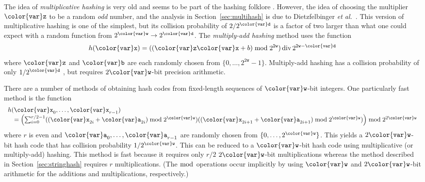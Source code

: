 \documentclass[10pt]{book}
\newcommand{\secref}[1]{Section~\ref{sec:#1}}
\theoremstyle{plain}
\theoremstyle{definition}
\newcommand{\etal}{\emph{et al.}}
\DeclareMathOperator{\ddiv}{div}
\begin{document}
The idea of \emph{multiplicative hashing}
%
%
is very old and seems to be
part of the hashing folklore \cite[Section~6.4]{k97v3}.  However, the
idea of choosing the multiplier \ensuremath{\mathtt{{\color{var}z}}} to be a random \emph{odd} number,
and the analysis in \secref{multihash} is due to Dietzfelbinger \etal\
\cite{dhkp97}.  This version of multiplicative hashing is one of the
simplest, but its collision probability of $2/2^{\ensuremath{\mathtt{{\color{var}d}}}}$ is a factor of two
larger than what one could expect with a random function from $2^{\ensuremath{\mathtt{{\color{var}w}}}}\to
2^{\ensuremath{\mathtt{{\color{var}d}}}}$.  The \emph{multiply-add hashing}
\index{hashing!multiply-add}%
%
method uses the function
\[
   h(\ensuremath{\mathtt{{\color{var}x}}}) = ((\ensuremath{\mathtt{{\color{var}z}}}\ensuremath{\mathtt{{\color{var}x}}} + b) \bmod 2^{\ensuremath{\mathtt{2w}}}) \ddiv 2^{\ensuremath{\mathtt{2w}}-\ensuremath{\mathtt{{\color{var}d}}}}
\]
where \ensuremath{\mathtt{{\color{var}z}}} and \ensuremath{\mathtt{{\color{var}b}}} are each randomly chosen from $\{0,\ldots,2^{\ensuremath{\mathtt{2w}}}-1\}$.
Multiply-add hashing has a collision probability of only $1/2^{\ensuremath{\mathtt{{\color{var}d}}}}$
\cite{d96}, but requires $2\ensuremath{\mathtt{{\color{var}w}}}$-bit precision arithmetic.

There are a number of methods of obtaining hash codes from fixed-length
sequences of \ensuremath{\mathtt{{\color{var}w}}}-bit integers.  One particularly fast method
\cite{bhkkr99} is the function
\[\begin{array}{l}
  h(\ensuremath{\mathtt{{\color{var}x}}}_0,\ldots,\ensuremath{\mathtt{{\color{var}x}}}_{r-1}) \\
   \quad = \left(\sum_{i=0}^{r/2-1} ((\ensuremath{\mathtt{{\color{var}x}}}_{2i}+\ensuremath{\mathtt{{\color{var}a}}}_{2i})\bmod 2^{\ensuremath{\mathtt{{\color{var}w}}}})((\ensuremath{\mathtt{{\color{var}x}}}_{2i+1}+\ensuremath{\mathtt{{\color{var}a}}}_{2i+1})\bmod 2^{\ensuremath{\mathtt{{\color{var}w}}}})\right) \bmod 2^{2\ensuremath{\mathtt{{\color{var}w}}}}
\end{array}
\]
where $r$ is even and $\ensuremath{\mathtt{{\color{var}a}}}_0,\ldots,\ensuremath{\mathtt{{\color{var}a}}}_{r-1}$ are randomly chosen from
$\{0,\ldots,2^{\ensuremath{\mathtt{{\color{var}w}}}}\}$. This yields a $2\ensuremath{\mathtt{{\color{var}w}}}$-bit hash code that has
collision probability $1/2^{\ensuremath{\mathtt{{\color{var}w}}}}$.  This can be reduced to a \ensuremath{\mathtt{{\color{var}w}}}-bit hash
code using multiplicative (or multiply-add) hashing. This method is fast
because it requires only $r/2$ $2\ensuremath{\mathtt{{\color{var}w}}}$-bit multiplications whereas the
method described in \secref{stringhash} requires $r$ multiplications.
(The $\bmod$ operations occur implicitly by using \ensuremath{\mathtt{{\color{var}w}}} and $2\ensuremath{\mathtt{{\color{var}w}}}$-bit
arithmetic for the additions and multiplications, respectively.)
\end{document}
